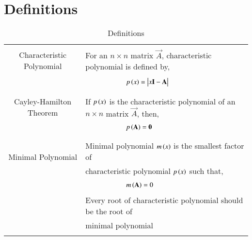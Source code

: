 \documentclass[journal,12pt]{IEEEtran}
\begin{document}
\section{\textbf{Definitions}}
\renewcommand{\thetable}{1}
\begin{table}[ht!]
\centering
\begin{tabular}{|c|l|}
    \hline
	\multirow{3}{*}{Characteristic Polynomial} 
	& \\
	& For an $n\times n$ matrix $\vec{A}$, characteristic polynomial is defined by,\\
	&\\
	& $\qquad\qquad\qquad p\brak{x}=\mydet{x\Vec{I}-\Vec{A}}$\\
	&\\
	\hline
	\multirow{3}{*}{Cayley-Hamilton Theorem}
    &\\
    & If $p\left(x\right)$ is the characteristic polynomial of an $n\times n$ matrix $\vec{A}$, then,\\
    &\\
    &$\qquad \qquad \qquad p\left(\mathbf{A}\right)=\mathbf{0}$\\
    &\\
    \hline
	\multirow{3}{*}{Minimal Polynomial} 
	&\\
	& Minimal polynomial $m\left(x\right)$ is the smallest factor of\\
	&characteristic polynomial $p\left(x\right)$ such that,\\
	&\\
	& $\qquad \qquad \qquad m\left(\mathbf{A}\right)=0$\\
	& \\
	& Every root of characteristic polynomial should be the root of\\
	&minimal polynomial\\
	&\\
    \hline
\end{tabular}
\label{table:1}
    \caption{Definitions}
\end{table}
\newpage
\end{document}

